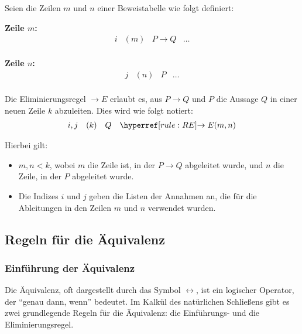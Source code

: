 \documentclass[main.tex]{subfiles}
\begin{document}
\begin{definition}
Seien die Zeilen \( m \) und \(n\) einer Beweistabelle wie folgt definiert:

\textbf{Zeile \( m \):}
\[
\begin{array}{llll}
    i & (m) & P \rightarrow Q & \dots \\
\end{array}
\]

\textbf{Zeile \( n \):}
\[
\begin{array}{llll}
    j & (n) & P & \dots \\
\end{array}
\]

Die Eliminierungsregel \(\rightarrow E\) erlaubt es, aus \(P \rightarrow Q\) und \(P\) die Aussage \(Q\) in einer neuen Zeile \( k \) abzuleiten. Dies wird wie folgt notiert:
\[
\begin{array}{llll}
    i, j & (k) & Q & \rRE{m,n} \\
\end{array}
\]

Hierbei gilt:
\begin{itemize}
    \item \(m, n < k\), wobei \(m\) die Zeile ist, in der \(P \rightarrow Q\) abgeleitet wurde, und \(n\) die Zeile, in der \(P\) abgeleitet wurde.
    \item Die Indizes \(i\) und \(j\) geben die Listen der Annahmen an, die für die Ableitungen in den Zeilen \(m\) und \(n\) verwendet wurden.
\end{itemize}
\end{definition}

\subsection{Regeln für die Äquivalenz}

\subsubsection{Einführung der Äquivalenz}
\label{rule:LRI}
Die Äquivalenz, oft dargestellt durch das Symbol \(\leftrightarrow\), ist ein logischer Operator, der \enquote{genau dann, wenn} bedeutet. Im Kalkül des natürlichen Schließens gibt es zwei grundlegende Regeln für die Äquivalenz: die Einführungs- und die Eliminierungsregel.
\end{document}
